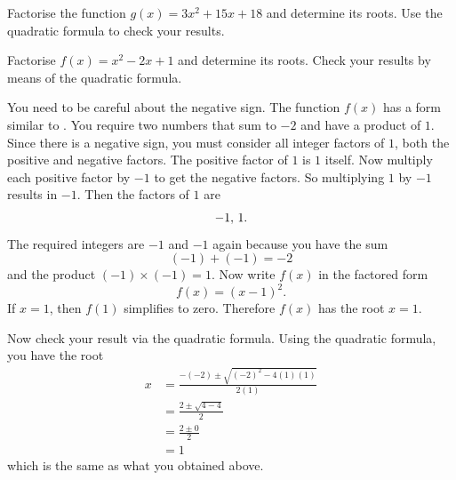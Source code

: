 \documentclass[a4paper,oneside,12pt]{article}
\begin{document}
\begin{exercise}
Factorise the function $g(x) = 3x^2 + 15x + 18$ and determine its
roots.  Use the quadratic formula to check your results.
\end{exercise}


\begin{example}
\label{eg:factored_form_bminus2_c1}
Factorise $f(x) = x^2 - 2x + 1$ and determine its roots.  Check your
results by means of the quadratic formula.
\end{example}

\begin{solution}
You need to be careful about the negative sign.  The function $f(x)$
has a form similar to .  You
require two numbers that sum to $-2$ and have a product of $1$.  Since
there is a negative sign, you must consider all integer factors of
$1$, both the positive and negative factors.  The positive factor of
$1$ is $1$ itself.  Now multiply each positive factor by $-1$ to get
the negative factors.  So multiplying $1$ by $-1$ results in $-1$.
Then the factors of $1$ are
\[
{-1},\, {1}.
\]
The required integers are $-1$ and $-1$ again because you have the sum
\[
(-1) + (-1)
=
-2
\]
and the product $(-1) \times (-1) = 1$.  Now write $f(x)$ in the
factored form
\[
f(x)
=
(x - 1)^2.
\]
If $x = 1$, then $f(1)$ simplifies to zero.  Therefore $f(x)$ has the
root $x = 1$.

Now check your result via the quadratic formula.  Using the quadratic
formula, you have the root
\begin{align*}
x
&=
\frac{
  -(-2)
  \pm
  \sqrt{(-2)^2 - 4(1)(1)}
}{
  2(1)
} \\[4pt]
&=
\frac{
  2
  \pm
  \sqrt{4 - 4}
}{
  2
} \\[4pt]
&=
\frac{
  2 \pm 0
}{
  2
} \\[4pt]
&=
1
\end{align*}
which is the same as what you obtained above.
\end{solution}
\end{document}
